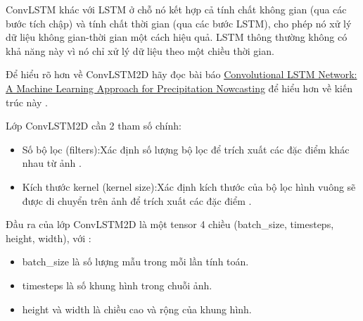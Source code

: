 ConvLSTM khác với LSTM ở chỗ nó kết hợp cả tính chất không gian (qua các bước tích chập) và tính chất thời gian (qua các bước LSTM), cho phép nó xử lý dữ liệu không gian-thời gian một cách hiệu quả. LSTM thông thường không có khả năng này vì nó chỉ xử lý dữ liệu theo một chiều thời gian.

Để hiểu rõ hơn về ConvLSTM2D hãy đọc bài báo \href{https://keras.io/api/layers/recurrent_layers/conv_lstm2d/}{Convolutional LSTM Network: A Machine Learning Approach for Precipitation Nowcasting} để hiểu hơn về kiến trúc này .

Lớp ConvLSTM2D cần 2 tham số chính:
\begin{itemize}
    \item Số bộ lọc (filters):Xác định số lượng bộ lọc để trích xuất các đặc điểm khác nhau từ ảnh .
    \item  Kích thước kernel (kernel size):Xác định kích thước của bộ lọc hình vuông sẽ được di chuyển trên ảnh để trích xuất các đặc điểm .
\end{itemize}

Đầu ra của lớp ConvLSTM2D là một tensor 4 chiều (batch\_size, timesteps, height, width), với :
\begin{itemize}
    \item batch\_size là số lượng mẫu trong mỗi lần tính toán.
    \item timesteps là số khung hình trong chuỗi ảnh.
    \item height và width là chiều cao và rộng của khung hình.
\end{itemize}


